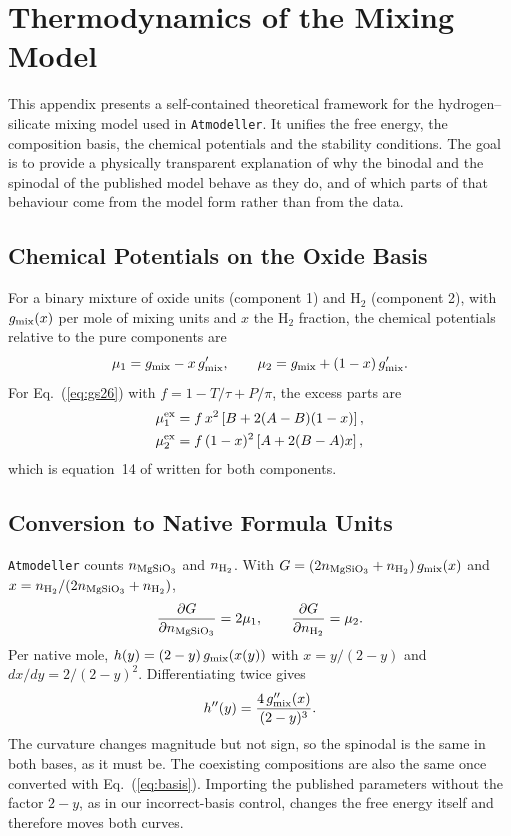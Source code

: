 \chapter{Thermodynamics of the Mixing Model}\label{app:thermo}

This appendix presents a self-contained theoretical framework for the hydrogen--silicate
mixing model used in \texttt{Atmodeller}. It unifies the free energy, the composition basis,
the chemical potentials and the stability conditions. The goal is to provide a physically
transparent explanation of why the binodal and the spinodal of the published model behave as
they do, and of which parts of that behaviour come from the model form rather than from the
data.

\section{Chemical Potentials on the Oxide Basis}

For a binary mixture of oxide units (component 1) and H$_2$ (component 2), with
$g_{\rm mix}(x)$ per mole of mixing units and $x$ the H$_2$ fraction, the chemical
potentials relative to the pure components are
\begin{equation}
\mu_1 = g_{\rm mix} - x\,g_{\rm mix}', \qquad \mu_2 = g_{\rm mix} + (1-x)\,g_{\rm mix}'.
\end{equation}
For Eq.~(\ref{eq:gs26}) with $f = 1-T/\tau+P/\pi$, the excess parts are
\begin{align}
\mu_1^{\rm ex} &= f\,x^2\left[B + 2(A-B)(1-x)\right],\\
\mu_2^{\rm ex} &= f\,(1-x)^2\left[A + 2(B-A)x\right],
\end{align}
which is equation~14 of \cite{gilmore2026} written for both components.

\section{Conversion to Native Formula Units}

\texttt{Atmodeller} counts $n_{\rm MgSiO_3}$ and $n_{\rm H_2}$. With
$G = (2n_{\rm MgSiO_3}+n_{\rm H_2})\,g_{\rm mix}(x)$ and
$x = n_{\rm H_2}/(2n_{\rm MgSiO_3}+n_{\rm H_2})$,
\begin{equation}
\frac{\partial G}{\partial n_{\rm MgSiO_3}} = 2\mu_1, \qquad
\frac{\partial G}{\partial n_{\rm H_2}} = \mu_2 .
\end{equation}
Per native mole, $h(y) = (2-y)\,g_{\rm mix}(x(y))$ with $x = y/(2-y)$ and
$dx/dy = 2/(2-y)^2$. Differentiating twice gives
\begin{equation}
h''(y) = \frac{4\,g_{\rm mix}''(x)}{(2-y)^3}.
\end{equation}
The curvature changes magnitude but not sign, so the spinodal is the same in both bases, as it
must be. The coexisting compositions are also the same once converted with
Eq.~(\ref{eq:basis}). Importing the published parameters without the factor $2-y$, as in our
incorrect-basis control, changes the free energy itself and therefore moves both curves.

